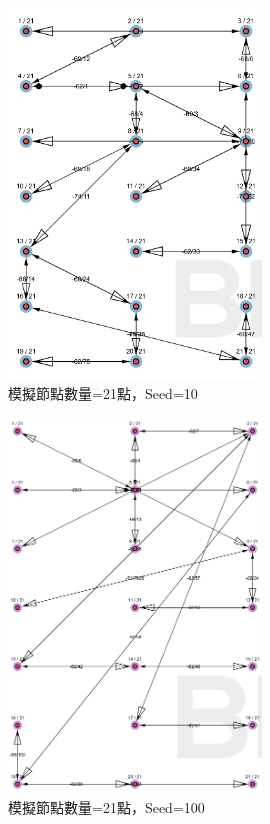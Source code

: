 \begin{ZhChapter}
\begin{figure}[H]
    \centering
    \includegraphics[width = 0.6\textwidth]{image/模擬實驗21點seed=10.png}
    \caption{模擬節點數量=21點，Seed=10}
    \label{fig: 模擬實驗21點seed=10}
\end{figure}

\begin{figure}[H]
    \centering
    \includegraphics[width = 0.6\textwidth]{image/模擬實驗21點seed=100.png}
    \caption{模擬節點數量=21點，Seed=100}
    \label{fig: 模擬實驗21點seed=100}
\end{figure}


\end{ZhChapter}

